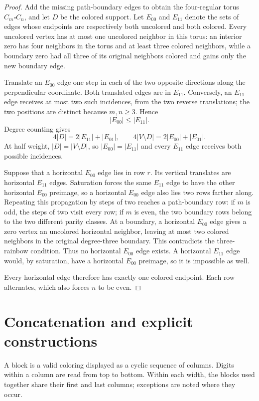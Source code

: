 \documentclass[11pt]{article}
\theoremstyle{definition}
\theoremstyle{remark}
\begin{document}
\begin{proof}
Add the missing path-boundary edges to obtain the four-regular torus $C_m\square C_n$, and let $D$ be the colored support. Let $E_{00}$ and $E_{11}$ denote the sets of edges whose endpoints are respectively both uncolored and both colored. Every uncolored vertex has at most one uncolored neighbor in this torus: an interior zero has four neighbors in the torus and at least three colored neighbors, while a boundary zero had all three of its original neighbors colored and gains only the new boundary edge.

Translate an $E_{00}$ edge one step in each of the two opposite directions along the perpendicular coordinate. Both translated edges are in $E_{11}$. Conversely, an $E_{11}$ edge receives at most two such incidences, from the two reverse translations; the two positions are distinct because $m,n\geq3$. Hence
\[
 |E_{00}|\leq |E_{11}|.
\]
Degree counting gives
\[
 4|D|=2|E_{11}|+|E_{01}|,
 \qquad
 4|V\setminus D|=2|E_{00}|+|E_{01}|.
\]
At half weight, $|D|=|V\setminus D|$, so $|E_{00}|=|E_{11}|$ and every $E_{11}$ edge receives both possible incidences.

Suppose that a horizontal $E_{00}$ edge lies in row $r$. Its vertical translates are horizontal $E_{11}$ edges. Saturation forces the same $E_{11}$ edge to have the other horizontal $E_{00}$ preimage, so a horizontal $E_{00}$ edge also lies two rows farther along. Repeating this propagation by steps of two reaches a path-boundary row: if $m$ is odd, the steps of two visit every row; if $m$ is even, the two boundary rows belong to the two different parity classes. At a boundary, a horizontal $E_{00}$ edge gives a zero vertex an uncolored horizontal neighbor, leaving at most two colored neighbors in the original degree-three boundary. This contradicts the three-rainbow condition. Thus no horizontal $E_{00}$ edge exists. A horizontal $E_{11}$ edge would, by saturation, have a horizontal $E_{00}$ preimage, so it is impossible as well.

Every horizontal edge therefore has exactly one colored endpoint. Each row alternates, which also forces $n$ to be even.
\end{proof}

\section{Concatenation and explicit constructions}\label{sec:constructions}

A block is a valid coloring displayed as a cyclic sequence of columns. Digits within a column are read from top to bottom. Within each width, the blocks used together share their first and last columns; exceptions are noted where they occur.
\end{document}
